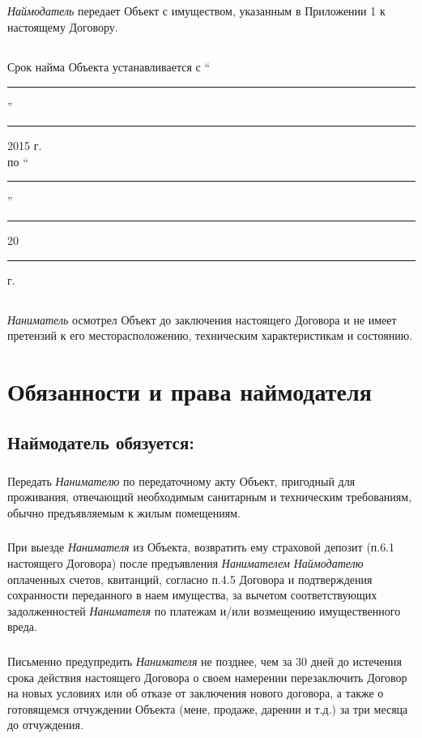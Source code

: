 \documentclass[a4paper, 11pt]{article}
\begin{document}
\subsection{} \textit{Наймодатель} передает Объект с имуществом, указанным в Приложении 1 к
настоящему Договору.
\subsection{} Срок найма Объекта устанавливается
с ``\rule{2cm}{0.5pt}'' \rule{4cm}{0.5pt} 2015 г. \\
по ``\rule{2cm}{0.5pt}'' \rule{4cm}{0.5pt} 20\rule{2cm}{0.5pt} г.

\subsection{} \textit{Наниматель} осмотрел Объект до заключения настоящего Договора и не имеет
претензий к его месторасположению, техническим характеристикам и состоянию.

\section{Обязанности и права наймодателя}
\subsection{Наймодатель обязуется:}
\subsubsection{} Передать \textit{Нанимателю} по передаточному акту Объект, пригодный для
проживания, отвечающий необходимым санитарным и техническим требованиям, обычно
предъявляемым к жилым помещениям.
\subsubsection{} При выезде \textit{Нанимателя} из Объекта, возвратить ему страховой депозит (п.6.1
настоящего Договора) после предъявления \textit{Нанимателем}
\textit{Наймодателю} оплаченных
счетов, квитанций, согласно п.4.5 Договора и подтверждения сохранности
переданного в наем имущества, за вычетом соответствующих задолженностей
\textit{Нанимателя} по платежам и/или возмещению имущественного вреда.
\subsubsection{} Письменно предупредить \textit{Нанимателя} не позднее, чем за 30 дней до
истечения срока действия настоящего Договора о своем намерении перезаключить
Договор на новых условиях или об отказе от заключения нового договора, а также о
готовящемся отчуждении Объекта (мене, продаже, дарении и т.д.) за три месяца до
отчуждения.
\end{document}

